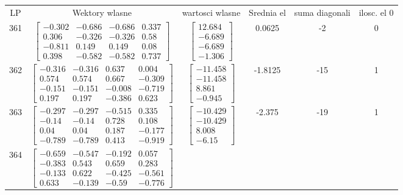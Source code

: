 \documentclass[a4paper,12pt]{article}
\begin{document}
\bgroup {} \vspace{0.2in} \begin{tabular}{c c c c c c}
LP &Wektory wlasne & wartosci wlasne & Srednia el & suma diagonali & ilosc. el 0\\
361
&
$\begin{bmatrix} -0.302 & -0.686 & -0.686 & 0.337 \\ 0.306 & -0.326 & -0.326 & 0.58 \\ -0.811 & 0.149 & 0.149 & 0.08 \\ 0.398 & -0.582 & -0.582 & 0.737 \end{bmatrix}$
&
$\begin{bmatrix} 12.684 \\ -6.689 \\ -6.689 \\ -1.306 \end{bmatrix}$
&
0.0625
&
-2
&
0
\\
362
&
$\begin{bmatrix} -0.316 & -0.316 & 0.637 & 0.004 \\ 0.574 & 0.574 & 0.667 & -0.309 \\ -0.151 & -0.151 & -0.008 & -0.719 \\ 0.197 & 0.197 & -0.386 & 0.623 \end{bmatrix}$
&
$\begin{bmatrix} -11.458 \\ -11.458 \\ 8.861 \\ -0.945 \end{bmatrix}$
&
-1.8125
&
-15
&
1
\\
363
&
$\begin{bmatrix} -0.297 & -0.297 & -0.515 & 0.335 \\ -0.14 & -0.14 & 0.728 & 0.108 \\ 0.04 & 0.04 & 0.187 & -0.177 \\ -0.789 & -0.789 & 0.413 & -0.919 \end{bmatrix}$
&
$\begin{bmatrix} -10.429 \\ -10.429 \\ 8.008 \\ -6.15 \end{bmatrix}$
&
-2.375
&
-19
&
1
\\
364
&
$\begin{bmatrix} -0.659 & -0.547 & -0.192 & 0.057 \\ -0.383 & 0.543 & 0.659 & 0.283 \\ -0.133 & 0.622 & -0.425 & -0.561 \\ 0.633 & -0.139 & -0.59 & -0.776 \end{bmatrix}$

\end{tabular}
\end{document}
